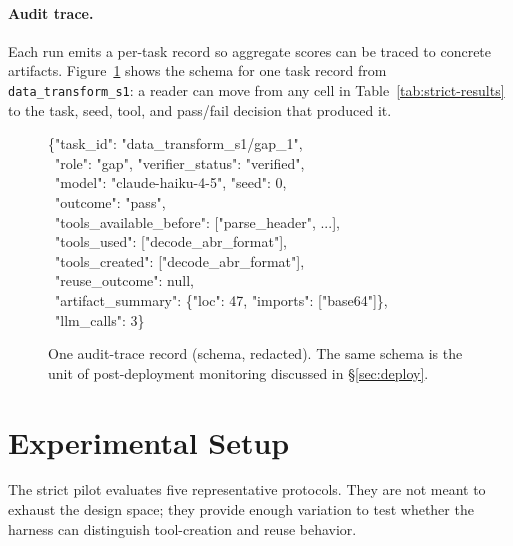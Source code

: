 \documentclass[sigconf,anonymous,review,natbib=false]{acmart}
\begin{document}
\paragraph{Audit trace.}
Each run emits a per-task record so aggregate scores can be traced to concrete artifacts. Figure~\ref{fig:trace-schema} shows the schema for one task record from \texttt{data\_transform\_s1}: a reader can move from any cell in Table~\ref{tab:strict-results} to the task, seed, tool, and pass/fail decision that produced it.

\begin{figure}[t]
\small
\begin{tcolorbox}[colframe=black!70, colback=gray!5, boxrule=0.5pt, fontupper=\ttfamily\footnotesize]
\{"task\_id": "data\_transform\_s1/gap\_1",\\
~"role": "gap", "verifier\_status": "verified",\\
~"model": "claude-haiku-4-5", "seed": 0,\\
~"outcome": "pass",\\
~"tools\_available\_before": ["parse\_header", ...],\\
~"tools\_used": ["decode\_abr\_format"],\\
~"tools\_created": ["decode\_abr\_format"],\\
~"reuse\_outcome": null,\\
~"artifact\_summary": \{"loc": 47, "imports": ["base64"]\},\\
~"llm\_calls": 3\}
\end{tcolorbox}
\caption{One audit-trace record (schema, redacted). The same schema is the unit of post-deployment monitoring discussed in \S\ref{sec:deploy}.}
\label{fig:trace-schema}
\end{figure}

\section{Experimental Setup}

The strict pilot evaluates five representative protocols. They are not meant to exhaust the design space; they provide enough variation to test whether the harness can distinguish tool-creation and reuse behavior.
\end{document}
